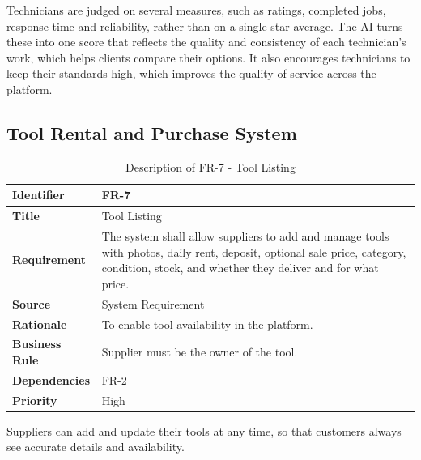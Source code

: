 \documentclass[A4paper,12pt]{report}
\theoremstyle{plain}
\theoremstyle{definition}
\theoremstyle{remark}
\numberwithin{equation}{section}
\begin{document}
Technicians are judged on several measures, such as ratings, completed jobs, response time and reliability, rather than on a single star average. The AI turns these into one score that reflects the quality and consistency of each technician's work, which helps clients compare their options. It also encourages technicians to keep their standards high, which improves the quality of service across the platform.
\newline

\subsection {Tool Rental and Purchase System}

\begin{table}[h!]
\centering
\caption{Description of FR-7 - Tool Listing}
\begin{tabular}{|p{}|p{}|}
\hline
\textbf{Identifier} & FR-7 \\ \hline
\textbf{Title} & Tool Listing \\ \hline
\textbf{Requirement} & The system shall allow suppliers to add and manage tools with photos, daily rent, deposit, optional sale price, category, condition, stock, and whether they deliver and for what price. \\ \hline
\textbf{Source} & System Requirement \\ \hline
\textbf{Rationale} & To enable tool availability in the platform. \\ \hline
\textbf{Business Rule} & Supplier must be the owner of the tool. \\ \hline
\textbf{Dependencies} & FR-2 \\ \hline
\textbf{Priority} & High \\ \hline
\end{tabular}
\end{table}

Suppliers can add and update their tools at any time, so that customers always see accurate details and availability.
\end{document}
